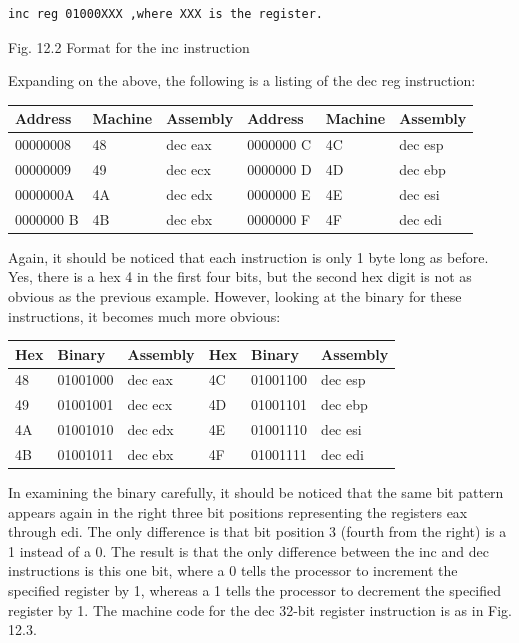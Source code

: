 \documentclass[10pt]{book}
\begin{document}
\begin{verbatim}
inc reg 01000XXX ,where XXX is the register.
\end{verbatim}

Fig. 12.2 Format for the inc instruction

Expanding on the above, the following is a listing of the dec reg instruction:

\begin{center}
\begin{tabular}{|l|l|l|l|l|l|}
\hline
Address & Machine & Assembly & Address & Machine & Assembly \\
\hline
00000008 & 48 & dec eax & 0000000 C & 4C & dec esp \\
\hline
00000009 & 49 & dec ecx & 0000000 D & 4D & dec ebp \\
\hline
0000000A & 4A & dec edx & 0000000 E & 4E & dec esi \\
\hline
0000000 B & 4B & dec ebx & 0000000 F & 4F & dec edi \\
\hline
\end{tabular}
\end{center}

Again, it should be noticed that each instruction is only 1 byte long as before. Yes, there is a hex 4 in the first four bits, but the second hex digit is not as obvious as the previous example. However, looking at the binary for these instructions, it becomes much more obvious:

\begin{center}
\begin{tabular}{|l|l|l|l|l|l|}
\hline
Hex & Binary & Assembly & Hex & Binary & Assembly \\
\hline
48 & 01001000 & dec eax & 4C & 01001100 & dec esp \\
\hline
49 & 01001001 & dec ecx & 4D & 01001101 & dec ebp \\
\hline
4A & 01001010 & dec edx & 4E & 01001110 & dec esi \\
\hline
4B & 01001011 & dec ebx & 4F & 01001111 & dec edi \\
\hline
\end{tabular}
\end{center}

In examining the binary carefully, it should be noticed that the same bit pattern appears again in the right three bit positions representing the registers eax through edi. The only difference is that bit position 3 (fourth from the right) is a 1 instead of a 0. The result is that the only difference between the inc and dec instructions is this one bit, where a 0 tells the processor to increment the specified register by 1, whereas a 1 tells the processor to decrement the specified register by 1. The machine code for the dec 32-bit register instruction is as in Fig. 12.3.
\end{document}
